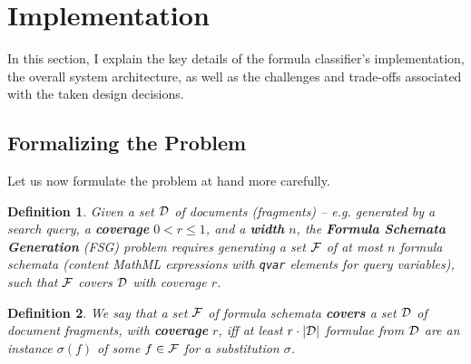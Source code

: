 \documentclass[a4paper,oneside]{article}
\newtheorem{definition}{Definition}
\begin{document}
\section{Implementation}\label{sec:implementation}

In this section, I explain the key details of the formula classifier's
implementation, the overall system architecture, as well as the challenges and
trade-offs associated with the taken design decisions.

\subsection{Formalizing the Problem}\label{subsec:formal_problem}
Let us now formulate the problem at hand more carefully.

\begin{definition}
  Given a set $\mathcal{D}$ of documents (fragments) -- e.g. generated by a search
  query, a \textbf{coverage} $0<r\leq1$, and a \textbf{width} $n$, the
  \textbf{Formula Schemata Generation} (FSG) problem requires generating
  a set $\mathcal{F}$ of at most $n$ formula schemata (content MathML expressions with
  \lstinline|qvar| elements for query variables), such that $\mathcal{F}$ covers $\mathcal{D}$
  with coverage $r$.
\end{definition}

\begin{definition}
  We say that a set $\mathcal{F}$ of formula schemata \textbf{covers} a set $\mathcal{D}$ of
  document fragments, with \textbf{coverage} $r$, iff at least $r \cdot |\mathcal{D}|$
  formulae from $\mathcal{D}$ are an instance $\sigma(f)$ of some $f\in\mathcal{F}$ for a
  substitution $\sigma$.
\end{definition}
\end{document}

